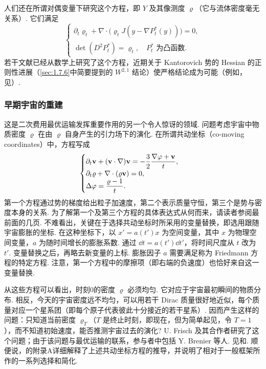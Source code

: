 人们还在所谓对偶变量下研究这个方程，即 $Y$ 及其像测度 $\varrho$（它与流体密度毫无关系）. 它们满足
\[
\begin{cases}
\partial_t\varrho_t+\nabla\cdot\bigl(\varrho_tJ(y-\nabla P_t^*(y))\bigr)=0,\\
\det(D^2P_t^*)=\varrho_t,\quad P_t^*\text{ 为凸函数}.
\end{cases}
\]
若干文献已经从数学上研究了这个方程，近期关于 Kantorovich 势的 Hessian 的正则性进展（\autoref{sec:1.7.6}中简要提到的 $W^{2,1}$ 结论）使严格结论成为可能（例如，见\cite{b16,b17}）.

\label{idx:i56-p320}
\subsubsection*{早期宇宙的重建}
这是二次费用最优运输发挥重要作用的另一个令人惊讶的领域. 问题考虑宇宙中物质密度 $\varrho$ 在由 $\varrho$ 自身产生的引力场下的演化. 在所谓共动坐标（co-moving coordinates）中，方程写成
\begin{equation}\label{eq:8.27}\index{E054@Euler方程（流体）（Euler equation (fluids)）|hyperpage}
\begin{cases}
\partial_t\mathbf v+(\mathbf v\cdot\nabla)\mathbf v=-\dfrac32\dfrac{\nabla\varphi+\mathbf v}{t},\\[2pt]
\partial_t\varrho+\nabla\cdot(\varrho\mathbf v)=0,\\
\Delta\varphi=\dfrac{\varrho-1}{t}.
\end{cases}
\end{equation}
第一个方程通过势的梯度给出粒子加速度，第二个表示质量守恒，第三个是势与密度本身的关系. 为了解第一个及第三个方程的具体表达式从何而来，请读者参阅\cite{b45}最前面的几页. 不难看出，关键在于选择共动坐标时所采用的变量替换，即选用跟随宇宙膨胀的坐标. 在这种坐标下，以 $x'=a(t')x$ 为空间变量，其中 $x$ 为物理空间变量，$a$ 为随时间增长的膨胀系数. 通过 $\dd t=a(t')\dd t'$，将时间尺度从 $t$ 改为 $t'$. 变量替换之后，再略去新变量的上标. 膨胀因子 $a$ 需要满足称为 Friedmann 方程的特定方程. 注意，第一个方程中的摩擦项（即右端的负速度）也恰好来自这一变量替换.

从这些方程可以看出，时刻0的密度 $\varrho$ 必须均匀. 它对应于宇宙最初瞬间的物质分布. 相反，今天的宇宙密度远不均匀，可以用若干 Dirac 质量很好地近似，每个质量对应一个星系团（即每个原子代表彼此十分接近的若干星系）. 因而产生这样的问题：只知道当前密度 $\varrho_T$（$T$ 是终止时刻，即现在，但为简单起见，令 $T=1$），而不知道初始速度，能否推测宇宙过去的演化? U. Frisch 及其合作者研究了这个问题；由于该问题与最优运输的联系，参与者中包括 Y. Brenier 等人. 见\cite{b89}和\cite{b172}. 顺便说，\cite{b89}的附录A详细解释了上述共动坐标方程的推导，并说明了相对于\cite{b45}一般框架所作的一系列选择和简化.

